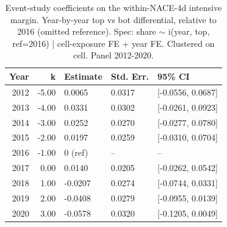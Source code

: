 \begin{table}[ht]
\centering
\caption{Event-study coefficients on the within-NACE-4d intensive margin. Year-by-year top vs bot differential, relative to 2016 (omitted reference). Spec: share $\sim$ i(year, top, ref=2016) | cell-exposure FE + year FE. Clustered on cell. Panel 2012-2020.}
\label{tab:phase4_within_intensive_did_eventstudy}
\begin{tabular}{rrlll}
  \toprule
Year & k & Estimate & Std. Err. & 95\% CI \\ 
  \midrule
2012 & -5.00 & 0.0065 & 0.0317 & [-0.0556, 0.0687] \\ 
  2013 & -4.00 & 0.0331 & 0.0302 & [-0.0261, 0.0923] \\ 
  2014 & -3.00 & 0.0252 & 0.0270 & [-0.0277, 0.0780] \\ 
  2015 & -2.00 & 0.0197 & 0.0259 & [-0.0310, 0.0704] \\ 
  2016 & -1.00 & 0 (ref) & -- & -- \\ 
  2017 & 0.00 & 0.0140 & 0.0205 & [-0.0262, 0.0542] \\ 
  2018 & 1.00 & -0.0207 & 0.0274 & [-0.0744, 0.0331] \\ 
  2019 & 2.00 & -0.0408 & 0.0279 & [-0.0955, 0.0139] \\ 
  2020 & 3.00 & -0.0578 & 0.0320 & [-0.1205, 0.0049] \\ 
   \bottomrule
\end{tabular}
\end{table}
